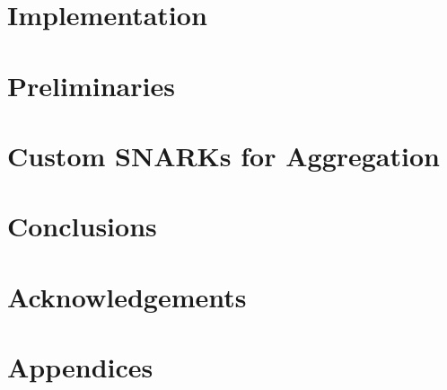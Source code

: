 \documentclass[runningheads]{llncs}
\begin{document}
\section{Implementation} \label{sec_implementation}
%


\vspace{-1.3cm}
\section{Preliminaries} \label{sec_prelims}

\vspace{-0.07in}

\vspace{-0.07in}

\vspace{-0.07in}
%






\section{Custom SNARKs for Aggregation } \label{sec_apk_proofs}


\vspace{-0.7cm}
\section{Conclusions}\label{conclusions}


\section{Acknowledgements} \label{sec_ack}





\onecolumn
\appendix
\section*{Appendices}




%









%

\end{document}
